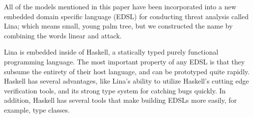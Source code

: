 All of the models mentioned in this paper have been incorporated into
a new embedded domain specific language (EDSL) for conducting threat
analysis called Lina; which means small, young palm tree, but we
constructed the name by combining the words linear and attack.
 
Lina is embedded inside of Haskell, a statically typed purely
functional programming language.  The most important property of any
EDSL is that they subsume the entirety of their host language, and can
be prototyped quite rapidly.  Haskell has several advantages, like
Lina's ability to utilize Haskell's cutting edge verification tools,
and its strong type system for catching bugs quickly.  In addition,
Haskell has several tools that make building EDSLs more easily, for
example, type classes.

